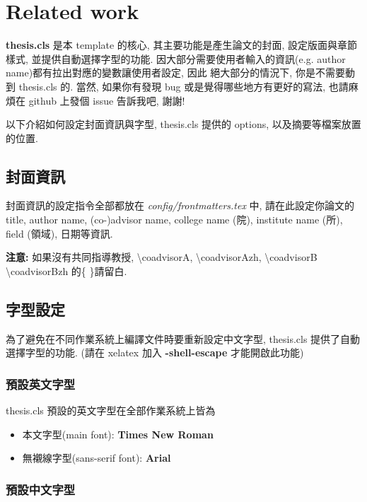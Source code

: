 \chapter{Related work}
\label{chapter:relate-work}

\textbf{thesis.cls} 是本 template 的核心, 其主要功能是產生論文的封面, 設定版面與章節樣式, 並提供自動選擇字型的功能.
因大部分需要使用者輸入的資訊(e.g. author name)都有拉出對應的變數讓使用者設定, 因此
絕大部分的情況下, 你是不需要動到 thesis.cls 的.
當然, 如果你有發現 bug 或是覺得哪些地方有更好的寫法, 也請麻煩在 github 上發個 issue 告訴我吧, 謝謝!

以下介紹如何設定封面資訊與字型, thesis.cls 提供的 options, 以及摘要等檔案放置的位置.

\section{封面資訊}

封面資訊的設定指令全部都放在 \textit{config/frontmatters.tex} 中, 請在此設定你論文的 title, author name, (co-)advisor name, college name (院), institute name (所), field (領域), 日期等資訊.

\textbf{注意:} 如果沒有共同指導教授, \textbackslash coadvisorA, \textbackslash coadvisorAzh, \textbackslash coadvisorB \textbackslash coadvisorBzh 的\{ \}請留白.

\section{字型設定}
\label{sec:fonts}

為了避免在不同作業系統上編譯文件時要重新設定中文字型, thesis.cls 提供了自動選擇字型的功能.
(請在 xelatex 加入 \textbf{-shell-escape} 才能開啟此功能)

\subsection{預設英文字型}

thesis.cls 預設的英文字型在全部作業系統上皆為
\begin{itemize}
\item 本文字型(main font): \textbf{Times New Roman}
\item 無襯線字型(sans-serif font): \textbf{Arial}
\end{itemize}

\subsection{預設中文字型}

